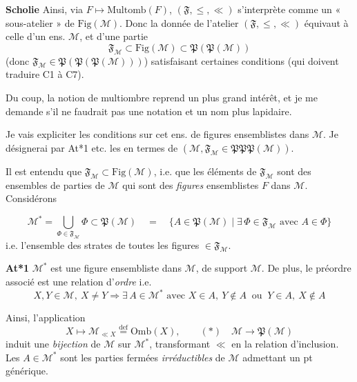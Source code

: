 \documentclass[11pt,a4paper]{article}
\begin{document}
\textbf{Scholie} Ainsi, via $F \mapsto \mathrm{Multomb}(F)$, $(\mathfrak{F}, \leq, \ll)$ s'interprète comme un « sous-atelier » de $\mathrm{Fig}(\mathcal{M})$. Donc la donnée de l'atelier $(\mathfrak{F}, \leq, \ll)$ équivaut à celle d'un ens. $\mathcal{M}$, et d'une partie
\[
  \mathfrak{F}_{\mathcal{M}} \subset \mathrm{Fig}(\mathcal{M}) \subset \mathfrak{P}(\mathfrak{P}(\mathcal{M})) \tag{1.44}
\]
(donc $\mathfrak{F}_{\mathcal{M}} \in \mathfrak{P}(\mathfrak{P}(\mathfrak{P}(\mathcal{M})))$) satisfaisant certaines conditions (qui doivent traduire C1 à C7).

Du coup, la notion de multiombre  reprend un plus grand intérêt, et je me demande s'il ne faudrait pas une notation  \ill{} et un nom plus lapidaire.

Je vais expliciter les conditions sur cet ens. de figures ensemblistes dans $\mathcal{M}$. Je désignerai par At*1 etc. les \ill{} en termes de $(\mathcal{M}, \mathfrak{F}_{\mathcal{M}} \in \mathfrak{P}\mathfrak{P}\mathfrak{P}(\mathcal{M}))$.

\struck{\ill{}} Il est entendu que $\mathfrak{F}_{\mathcal{M}} \subset \mathrm{Fig}(\mathcal{M})$, i.e.  que les éléments de $\mathfrak{F}_{\mathcal{M}}$ sont des ensembles de parties de $\mathcal{M}$ qui sont des \emph{figures} ensemblistes $F$ dans $\mathcal{M}$.  Considérons

\[
  \mathcal{M}^{*} = \bigcup_{\Phi \in \mathfrak{F}_{\mathcal{M}}} \Phi \subset \mathfrak{P}(\mathcal{M}) \quad = \quad \lbrace A \in \mathfrak{P}(\mathcal{M}) \mid \exists\, \Phi \in \mathfrak{F}_{\mathcal{M}} \text{ avec } A \in \Phi \rbrace
\]
i.e. l'ensemble des strates de toutes les figures $\in \mathfrak{F}_{\mathcal{M}}$.

\textbf{At*1} $\mathcal{M}^{*}$ est une figure ensembliste dans $\mathcal{M}$, de support $\mathcal{M}$. De plus, le préordre associé  est une relation d'\emph{ordre} i.e.
\[
  X, Y \in \mathcal{M},\ X \neq Y \Longrightarrow \exists\, A \in \mathcal{M}^{*} \text{ avec } X \in A,\ Y \notin A \ \text{ ou } \ Y \in A,\ X \notin A
\]

Ainsi, l'application
\[
  X \longmapsto \mathcal{M}_{\ll X} \overset{\mathrm{def}}{=} \mathrm{Omb}(X), \qquad (*) \quad \mathcal{M} \longrightarrow \mathfrak{P}(\mathcal{M})
\]
induit une \emph{bijection} de $\mathcal{M}$ sur $\mathcal{M}^{*}$, transformant $\ll$ en la relation d'inclusion. Les $A \in \mathcal{M}^{*}$ sont les parties fermées \emph{irréductibles} de $\mathcal{M}$ admettant un pt générique.
\end{document}
